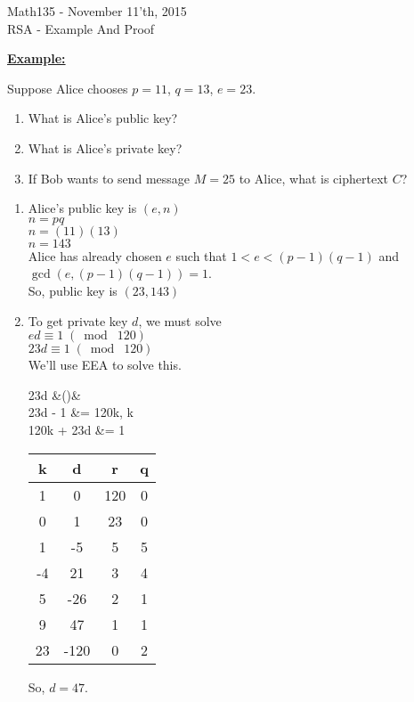 \documentclass{letter}
\begin{document}
	\begin{center}
		\LARGE Math135 - November 11'th, 2015\\
		\large RSA - Example And Proof
	\end{center}
	\vspace{0.25 in}
	\underline{\textbf{Example:}}
	
	Suppose Alice chooses $p=11$, $q=13$, $e=23$.
	\begin{enumerate}[1)]
		\item What is Alice's public key?
		\item What is Alice's private key?
		\item If Bob wants to send message $M=25$ to Alice, what is ciphertext $C$?
	\end{enumerate}
	\begin{enumerate}[1)]
		\item Alice's public key is $(e, n)$\\
		$n=pq$\\
		$n = (11)(13)$\\
		$n = 143$\\
		Alice has already chosen $e$ such that $1 < e < (p-1)(q-1)$ and $\gcd(e, (p-1)(q-1)) = 1$.\\
		So, public key is $(23, 143)$
		\item To get private key $d$, we must solve\\
		$ed \equiv 1\;(\bmod\; 120)$\\
		$23d \equiv 1 \;(\bmod\; 120)$\\
		
		We'll use EEA to solve this.
		\begin{flalign*}
			23d &\;(\bmod\; 120)&\\
			23d - 1 &= 120k, k \in {}\\
			120k + 23d &= 1\\
		\end{flalign*}
		\begin{tabular}{c|c|c|c}
			k&d&r&q\\
			\hline
			1&0&120&0\\
			0&1&23&0\\
			1&-5&5&5\\
			-4&21&3&4\\
			5&-26&2&1\\
			9&47&1&1\\
			23&-120&0&2
		\end{tabular}
		\;\;\;\;\;\;\;\;\;\;\;So, $d=47$.\\
		

\end{enumerate}
\end{document}
